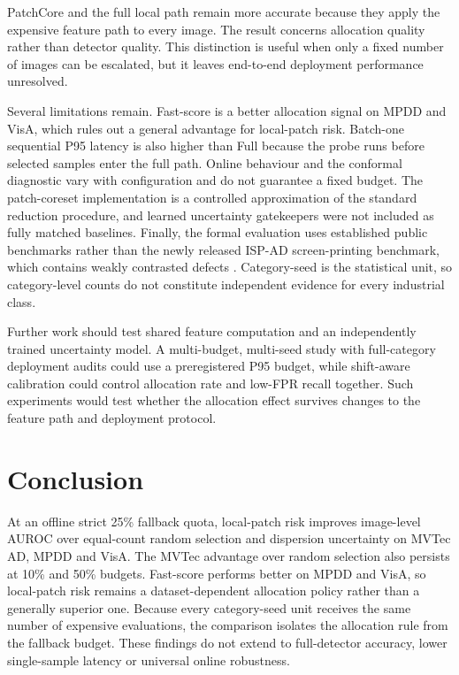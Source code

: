 \documentclass[iicol,pdflatex,sn-basic,Numbered]{sn-jnl}
\begin{document}
PatchCore and the full local path remain more accurate because they apply the expensive feature path to every image. The result concerns allocation quality rather than detector quality. This distinction is useful when only a fixed number of images can be escalated, but it leaves end-to-end deployment performance unresolved.

Several limitations remain. Fast-score is a better allocation signal on MPDD and VisA, which rules out a general advantage for local-patch risk. Batch-one sequential P95 latency is also higher than Full because the probe runs before selected samples enter the full path. Online behaviour and the conformal diagnostic vary with configuration and do not guarantee a fixed budget. The patch-coreset implementation is a controlled approximation of the standard reduction procedure, and learned uncertainty gatekeepers were not included as fully matched baselines. Finally, the formal evaluation uses established public benchmarks rather than the newly released ISP-AD screen-printing benchmark, which contains weakly contrasted defects \cite{krassnig2026isp}. Category-seed is the statistical unit, so category-level counts do not constitute independent evidence for every industrial class.

Further work should test shared feature computation and an independently trained uncertainty model. A multi-budget, multi-seed study with full-category deployment audits could use a preregistered P95 budget, while shift-aware calibration could control allocation rate and low-FPR recall together. Such experiments would test whether the allocation effect survives changes to the feature path and deployment protocol.

\section{Conclusion}\label{sec:conclusion}

At an offline strict 25\% fallback quota, local-patch risk improves image-level AUROC over equal-count random selection and dispersion uncertainty on MVTec AD, MPDD and VisA. The MVTec advantage over random selection also persists at 10\% and 50\% budgets. Fast-score performs better on MPDD and VisA, so local-patch risk remains a dataset-dependent allocation policy rather than a generally superior one. Because every category-seed unit receives the same number of expensive evaluations, the comparison isolates the allocation rule from the fallback budget. These findings do not extend to full-detector accuracy, lower single-sample latency or universal online robustness.
\end{document}
